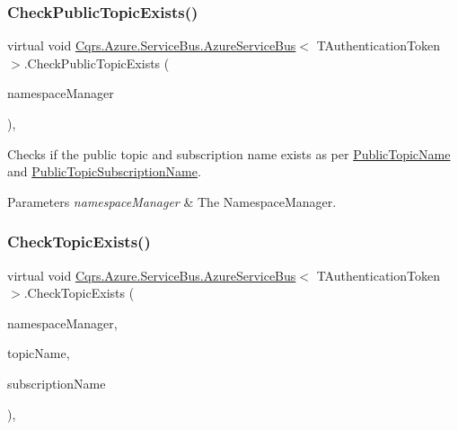 \subsubsection{\texorpdfstring{Check\+Public\+Topic\+Exists()}{CheckPublicTopicExists()}}
{\footnotesize\ttfamily virtual void \hyperlink{classCqrs_1_1Azure_1_1ServiceBus_1_1AzureServiceBus}{Cqrs.\+Azure.\+Service\+Bus.\+Azure\+Service\+Bus}$<$ T\+Authentication\+Token $>$.Check\+Public\+Topic\+Exists (\begin{DoxyParamCaption}\item[{Namespace\+Manager}]{namespace\+Manager }\end{DoxyParamCaption})\hspace{0.3cm}{\ttfamily [protected]}, {\ttfamily [virtual]}}



Checks if the public topic and subscription name exists as per \hyperlink{classCqrs_1_1Azure_1_1ServiceBus_1_1AzureServiceBus_ac6f4fbafebcde04a8493462b688e0abe_ac6f4fbafebcde04a8493462b688e0abe}{Public\+Topic\+Name} and \hyperlink{classCqrs_1_1Azure_1_1ServiceBus_1_1AzureServiceBus_adab1b2f0dc9f199d5f0aa60d57ba71c8_adab1b2f0dc9f199d5f0aa60d57ba71c8}{Public\+Topic\+Subscription\+Name}. 


\begin{DoxyParams}{Parameters}
{\em namespace\+Manager} & The Namespace\+Manager.\\
\hline
\end{DoxyParams}
\mbox{\label{classCqrs_1_1Azure_1_1ServiceBus_1_1AzureServiceBus_a167ace15de6e40d5ec0b0c2e0fd95504_a167ace15de6e40d5ec0b0c2e0fd95504}} 
\subsubsection{\texorpdfstring{Check\+Topic\+Exists()}{CheckTopicExists()}}
{\footnotesize\ttfamily virtual void \hyperlink{classCqrs_1_1Azure_1_1ServiceBus_1_1AzureServiceBus}{Cqrs.\+Azure.\+Service\+Bus.\+Azure\+Service\+Bus}$<$ T\+Authentication\+Token $>$.Check\+Topic\+Exists (\begin{DoxyParamCaption}\item[{Namespace\+Manager}]{namespace\+Manager,  }\item[{string}]{topic\+Name,  }\item[{string}]{subscription\+Name }\end{DoxyParamCaption})\hspace{0.3cm}{\ttfamily [protected]}, {\ttfamily [virtual]}}



